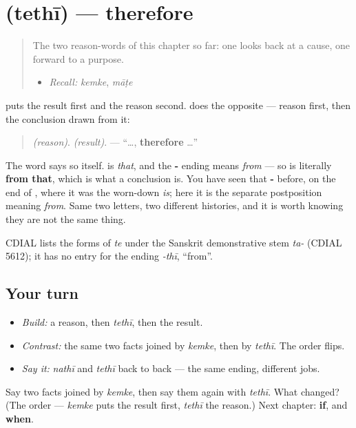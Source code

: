 \section[\texorpdfstring{\gu{તેથી} (tethī)}{તેથી (tethī)}]{ (tethī) — therefore}

\label{lesson:GU-C34-tethi}



\begin{quote}
The two reason-words of this chapter so far: one looks back at a cause, one forward to a purpose.

\begin{itemize}
\raggedright
  \item \emph{Recall:} \emph{kemke}, \emph{māṭe}
\end{itemize}
\end{quote}

\begin{cousinweb}
\textbf{} puts the result first and the reason second. \textbf{} does the opposite — reason first, then the conclusion drawn from it:

\begin{quote}
\emph{(reason)}. \textbf{} \emph{(result)}. — \textquotedblleft{}…, \textbf{therefore} …\textquotedblright{}
\end{quote}

The word says so itself. \textbf{} is \emph{that}, and the \textbf{-} ending means \emph{from} — so \textbf{} is literally \textbf{from that}, which is what a conclusion is. You have seen that \textbf{-} before, on the end of \textbf{}, where it was the worn-down \emph{is}; here it is the separate postposition meaning \emph{from}. Same two letters, two different histories, and it is worth knowing they are not the same thing.

CDIAL lists the forms of \emph{te} under the Sanskrit demonstrative stem \emph{ta-} (CDIAL 5612); it has no entry for the ending \emph{-thī}, \textquotedblleft{}from\textquotedblright{}.
\end{cousinweb}

\subsection*{Your turn}
\begin{itemize}
\raggedright
  \item \emph{Build:} a reason, then \emph{tethī}, then the result.
  \item \emph{Contrast:} the same two facts joined by \emph{kemke}, then by \emph{tethī}. The order flips.
  \item \emph{Say it:} \emph{nathī} and \emph{tethī} back to back — the same ending, different jobs.
\end{itemize}

\begin{tcolorbox}[breakable,colback=teal!4,colframe=teal!35!black,title={Before you move on}]
Say two facts joined by \emph{kemke}, then say them again with \emph{tethī}. What changed? (The order — \emph{kemke} puts the result first, \emph{tethī} the reason.) Next chapter: \textbf{if}, and \textbf{when}.
\end{tcolorbox}
